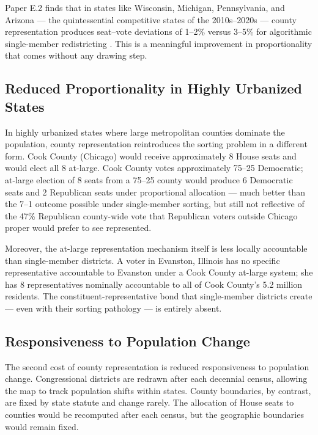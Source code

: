 Paper E.2 finds that in states like Wisconsin, Michigan, Pennsylvania, and
Arizona --- the quintessential competitive states of the 2010s--2020s ---
county representation produces seat--vote deviations of 1--2\% versus 3--5\%
for algorithmic single-member redistricting \citep{dellaLibera2026e2}.  This
is a meaningful improvement in proportionality that comes without any drawing
step.

\subsection{Reduced Proportionality in Highly Urbanized States}

In highly urbanized states where large metropolitan counties dominate the
population, county representation reintroduces the sorting problem in a
different form.  Cook County (Chicago) would receive approximately 8 House
seats and would elect all 8 at-large.  Cook County votes approximately 75--25
Democratic; at-large election of 8 seats from a 75--25 county would produce
6 Democratic seats and 2 Republican seats under proportional allocation --- much
better than the 7--1 outcome possible under single-member sorting, but still
not reflective of the 47\% Republican county-wide vote that Republican voters
outside Chicago proper would prefer to see represented.

Moreover, the at-large representation mechanism itself is less locally
accountable than single-member districts.  A voter in Evanston, Illinois
has no specific representative accountable to Evanston under a Cook County
at-large system; she has 8 representatives nominally accountable to all of
Cook County's 5.2 million residents.  The constituent-representative bond
that single-member districts create --- even with their sorting pathology ---
is entirely absent.

\subsection{Responsiveness to Population Change}

The second cost of county representation is reduced responsiveness to population
change.  Congressional districts are redrawn after each decennial census,
allowing the map to track population shifts within states.  County boundaries,
by contrast, are fixed by state statute and change rarely.  The allocation of
House seats to counties would be recomputed after each census, but the
geographic boundaries would remain fixed.

